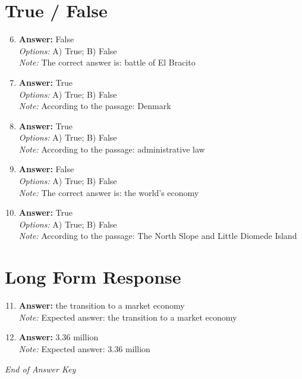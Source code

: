\documentclass[12pt]{article}
\begin{document}
\section*{True / False}
\begin{enumerate}[label=\arabic*.]
\setcounter{enumi}{5}
\item \textbf{Answer:} False
\\ \textit{Options:} A) True; B) False
\\ \textit{Note:} The correct answer is: battle of El Bracito
\item \textbf{Answer:} True
\\ \textit{Options:} A) True; B) False
\\ \textit{Note:} According to the passage: Denmark
\item \textbf{Answer:} True
\\ \textit{Options:} A) True; B) False
\\ \textit{Note:} According to the passage: administrative law
\item \textbf{Answer:} False
\\ \textit{Options:} A) True; B) False
\\ \textit{Note:} The correct answer is: the world's economy
\item \textbf{Answer:} True
\\ \textit{Options:} A) True; B) False
\\ \textit{Note:} According to the passage: The North Slope and Little Diomede Island
\end{enumerate}

\section*{Long Form Response}
\begin{enumerate}[label=\arabic*.]
\setcounter{enumi}{10}
\item \textbf{Answer:} the transition to a market economy
\\ \textit{Note:} Expected answer: the transition to a market economy
\item \textbf{Answer:} 3.36 million
\\ \textit{Note:} Expected answer: 3.36 million
\end{enumerate}

\vfill
\noindent\textit{End of Answer Key}
\end{document}
